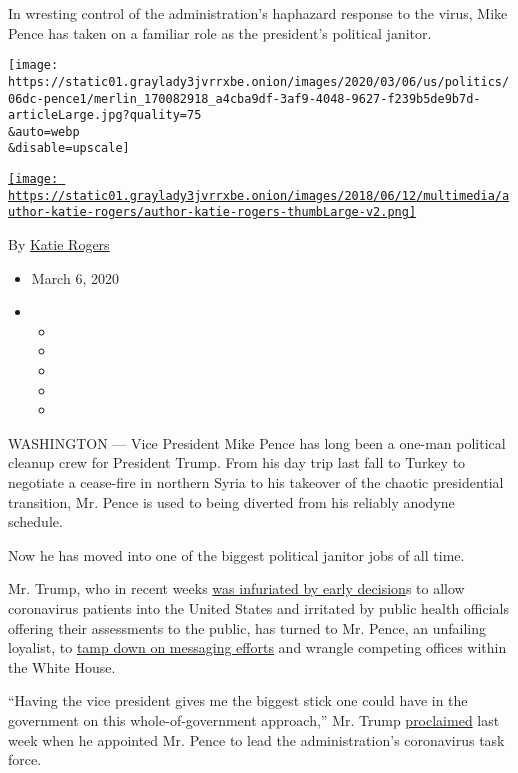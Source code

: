 In wresting control of the administration's haphazard response to the
virus, Mike Pence has taken on a familiar role as the president's
political janitor.

\texttt{[image: https://static01.graylady3jvrrxbe.onion/images/2020/03/06/us/politics/06dc-pence1/merlin\_170082918\_a4cba9df-3af9-4048-9627-f239b5de9b7d-articleLarge.jpg?quality=75\\\&auto=webp\\\&disable=upscale]}

\href{https://www.nytimes3xbfgragh.onion/by/katie-rogers}{\texttt{[image: https://static01.graylady3jvrrxbe.onion/images/2018/06/12/multimedia/author-katie-rogers/author-katie-rogers-thumbLarge-v2.png]}}

By \href{https://www.nytimes3xbfgragh.onion/by/katie-rogers}{Katie
Rogers}

\begin{itemize}
\item
  March 6, 2020
\item
  \begin{itemize}
  \item
  \item
  \item
  \item
  \item
  \end{itemize}
\end{itemize}

WASHINGTON --- Vice President Mike Pence has long been a one-man
political cleanup crew for President Trump. From his day trip last fall
to Turkey to negotiate a cease-fire in northern Syria to his takeover of
the chaotic presidential transition, Mr. Pence is used to being diverted
from his reliably anodyne schedule.

Now he has moved into one of the biggest political janitor jobs of all
time.

Mr. Trump, who in recent weeks
\href{https://www.nytimes3xbfgragh.onion/2020/02/22/us/politics/trump-coronavirus-cruise-ship.html}{was
infuriated by early decision}s to allow coronavirus patients into the
United States and irritated by public health officials offering their
assessments to the public, has turned to Mr. Pence, an unfailing
loyalist, to
\href{https://www.nytimes3xbfgragh.onion/2020/02/27/us/politics/us-coronavirus-pence.html}{tamp
down on messaging efforts} and wrangle competing offices within the
White House.

``Having the vice president gives me the biggest stick one could have in
the government on this whole-of-government approach,'' Mr. Trump
\href{https://www.whitehouse.gov/briefings-statements/remarks-president-trump-vice-president-pence-members-coronavirus-task-force-press-conference/}{proclaimed}
last week when he appointed Mr. Pence to lead the administration's
coronavirus task force.

